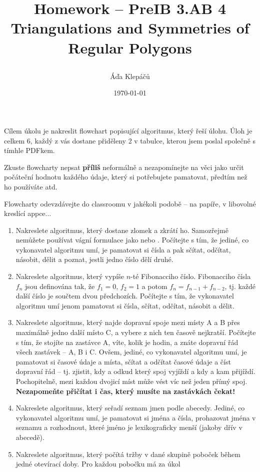 \documentclass[a4paper,11pt]{article}
\title{\Huge\textsf{Homework -- PreIB 3.AB 4}\\
 \Large\textsf{Triangulations and Symmetries of Regular Polygons}
 \author{Áďa Klepáčů}
 \date{\today}
}
\begin{document}
\thispagestyle{fancy}

Cílem úkolu je nakreslit flowchart popisující algoritmus, který řeší úlohu. Úloh
je celkem 6, každý z vás dostane přiděleny 2 v tabulce, kterou jsem poslal
společně s tímhle PDFkem.

Zkuste flowcharty nepsat \textbf{příliš} neformálně a nezapomínejte na věci jako
určit počáteční hodnotu každého údaje, který si potřebujete pamatovat, předtím
než ho používáte atd.

Flowcharty odevzdávejte do classroomu v jakékoli podobě -- na papíře, v
libovolné kreslící appce...

\begin{enumerate}
 \item Nakreslete algoritmus, který dostane zlomek a zkrátí ho. Samozřejmě
  nemůžete používat vágní formulace jako  nebo .
  Počítejte s tím, že jediné, co vykonavatel algoritmu umí, je pamatovat si
  čísla a pak sčítat, odčítat, násobit, dělit a poznat, jestli jedno číslo dělí
  druhé.
 \item Nakreslete algoritmus, který vypíše $n$-té Fibonacciho číslo. Fibonacciho
  čísla $f_n$ jsou definována tak, že $f_1 = 0$, $f_2 = 1$ a potom $f_n =
  f_{n-1} + f_{n-2}$, tj. každé další číslo je součtem dvou předchozích.
  Počítejte s tím, že vykonavatel algoritmu umí jenom pamatovat si čísla,
  sčítat, odčítat, násobit a dělit.
 \item Nakreslete algoritmus, který najde dopravní spoje mezi místy A a B přes
  maximálně jedno další místo C, a vybere z nich ten časově nejkratší. Počítejte
  s tím, že stojíte na zastávce A, víte, kolik je hodin, a znáte dopravní řád
  všech zastávek -- A, B i C. Ovšem, jediné, co vykonavatel algoritmu umí, je
  pamatovat si časové údaje a místa, sčítat a odčítat časové údaje a číst
  dopravní řád -- tj. zjistit, kdy a odkud který spoj vyjíždí a kdy a kam
  přijíždí. Pochopitelně, mezi každou dvojicí míst může vést víc než jeden přímý
  spoj. \textbf{Nezapomeňte přičítat i čas, který musíte na zastávkách čekat!}
 \item Nakreslete algoritmus, který seřadí seznam jmen podle abecedy. Jediné, co
  vykonavatel algoritmu umí, je pamatovat si jména a čísla, prohazovat jména v
  seznamu a rozhodnout, které jméno je lexikograficky menší (jakoby dřív v~
  abecedě).
 \item Nakreslete algoritmus, který počítá tržby v dané skupině poboček během
  jedné otevírací doby. Pro každou pobočku má za úkol

\end{enumerate}
\end{document}
